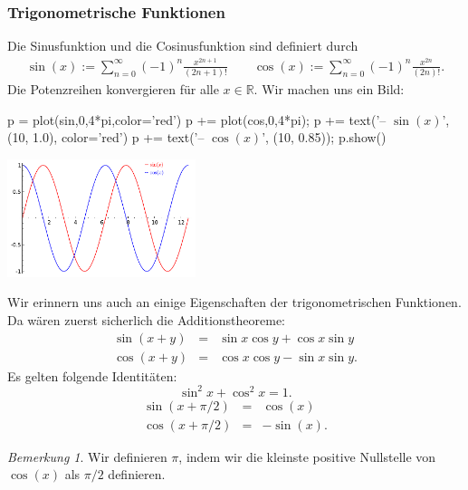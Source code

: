\documentclass[fontsize=12pt,paper=a4,twoside,bibtotoc,idxtotoc,
liststotoc,pagesize,BCOR1.2cm,DIV15,chapterprefix,pagesize=pdftex]{scrbook}
\theoremstyle{plain}
\theoremstyle{definition}
\theoremstyle{remark}
\newtheorem{bem}[equation]{Bemerkung}
\begin{document}
\subsubsection{Trigonometrische Funktionen}
Die Sinusfunktion und die Cosinusfunktion sind definiert
durch
\begin{eqnarray*}
\sin(x) := \sum_{n=0}^\infty (-1)^n \frac{x^{2n+1}}{(2n+1)!} \quad\quad
\cos(x) := \sum_{n=0}^\infty (-1)^n \frac{x^{2n}}{(2n)!}. 
\end{eqnarray*}
Die Potenzreihen konvergieren für alle $x \in \mathbb{R}$. Wir machen uns ein Bild:
\begin{sagein}
p = plot(sin,0,4*pi,color='red')
p += plot(cos,0,4*pi); 
p += text('-- $\sin(x)$', (10, 1.0), color='red')
p += text('-- $\cos(x)$', (10, 0.85)); p.show()
\end{sagein}
\begin{center}
\includegraphics[width=5.5cm]{sincos.pdf}
\end{center}
Wir erinnern uns auch an einige Eigenschaften der trigonometrischen Funktionen. Da wären zuerst sicherlich die Additionstheoreme:
\begin{eqnarray*}
\sin(x+y) & = &\sin x \cos y+ \cos x \sin y \\
\cos(x+y) & = &\cos x \cos y - \sin x \sin y .
\end{eqnarray*} 
Es gelten folgende Identitäten: 
\[\sin^2x +\cos^2x=1.\]
 \begin{eqnarray*}
\sin(x+\pi/2)&=&\cos(x)\\
 \cos(x+\pi/2)&=&-\sin(x).
\end{eqnarray*} 
\begin{bem}
 Wir definieren $\pi$, indem wir die kleinste positive Nullstelle
von $\cos(x)$ als $\pi/2$ definieren.
\end{bem}
\end{document}
